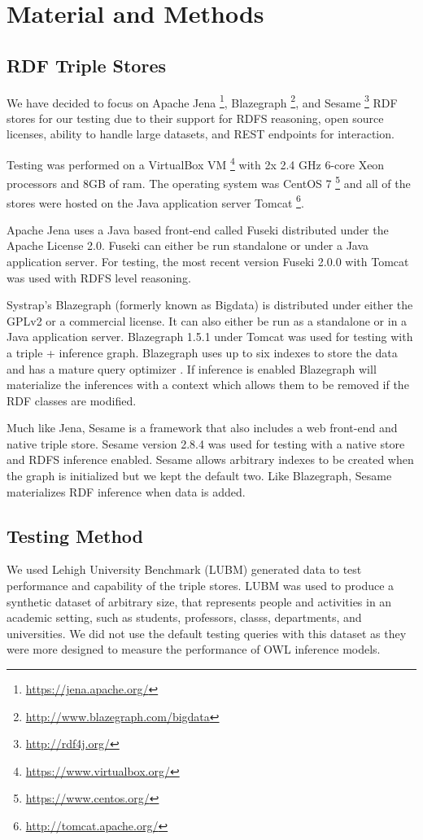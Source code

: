 \documentclass{llncs}
\begin{document}
\section{Material and Methods}
\subsection{RDF Triple Stores}

We have decided to focus on Apache Jena \footnote{\url{https://jena.apache.org/}}, Blazegraph \footnote{\url{http://www.blazegraph.com/bigdata}}, and Sesame \footnote{\url{http://rdf4j.org/}}  RDF stores for our testing due to their support for RDFS reasoning, open source licenses, ability to handle large datasets, and REST endpoints for interaction. \cite{Voigt2012}

Testing was performed on a VirtualBox VM \footnote{\url{https://www.virtualbox.org/}} with 2x 2.4 GHz 6-core Xeon processors and 8GB of ram.  The operating system was CentOS 7 \footnote{\url{https://www.centos.org/}} and all of the stores were hosted on the Java application server Tomcat \footnote{\url{http://tomcat.apache.org/}}.

Apache Jena uses a Java based front-end called Fuseki distributed under the Apache License 2.0.  Fuseki can either be run standalone or under a Java application server.  For testing, the most recent version Fuseki 2.0.0 with Tomcat was used with RDFS level reasoning.

Systrap's Blazegraph (formerly known as Bigdata) is distributed under either the GPLv2 or a commercial license.  It can also either be run as a standalone or in a Java application server.  Blazegraph 1.5.1 under Tomcat was used for testing with a triple + inference graph.  Blazegraph uses up to six indexes to store the data and has a mature query optimizer \cite{RDFDatabaseSystems}.  If inference is enabled Blazegraph will materialize the inferences with a context which allows them to be removed if the RDF classes are modified.

Much like Jena, Sesame is a framework that also includes a web front-end and native triple store.  Sesame version 2.8.4 was used for testing with a native store and RDFS inference enabled.  Sesame allows arbitrary indexes to be created when the graph is initialized but we kept the default two.  Like Blazegraph, Sesame materializes RDF inference when data is added.

\subsection{Testing Method}
We used Lehigh University Benchmark (LUBM) \cite{Guo2005} generated data to test performance and capability of the triple stores. LUBM was used to produce a synthetic dataset of arbitrary size, that represents people and activities in an academic setting, such as students, professors, classs, departments, and universities.  We did not use the default testing queries with this dataset as they were more designed to measure the performance of OWL inference models.
\end{document}

